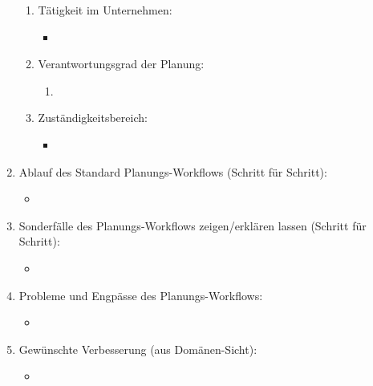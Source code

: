 \documentclass[Bachelorarbeit.tex]{subfiles}
\begin{document}
\begin{enumerate}
	\begin{enumerate}
		\item Tätigkeit im Unternehmen:
		\begin{itemize}
			\item[] 
		\end{itemize}
		\item Verantwortungsgrad der Planung:
		\begin{enumerate}
			\item[] 
		\end{enumerate}
		\item Zuständigkeitsbereich:
		\begin{itemize}
			\item[] 
		\end{itemize}
	\end{enumerate}
	\item Ablauf des Standard Planungs-Workflows (Schritt für Schritt):
	\begin{itemize}
		\item[] 
	\end{itemize}
	\item Sonderfälle des Planungs-Workflows zeigen/erklären lassen (Schritt für Schritt):
	\begin{itemize}
		\item[] 
	\end{itemize}
	\item Probleme und Engpässe des Planungs-Workflows:
	\begin{itemize}
		\item[] 
	\end{itemize}
	\item Gewünschte Verbesserung (aus Domänen-Sicht):
	\begin{itemize}
		\item[] 
	\end{itemize}
\end{enumerate}
\newpage
\end{document}
